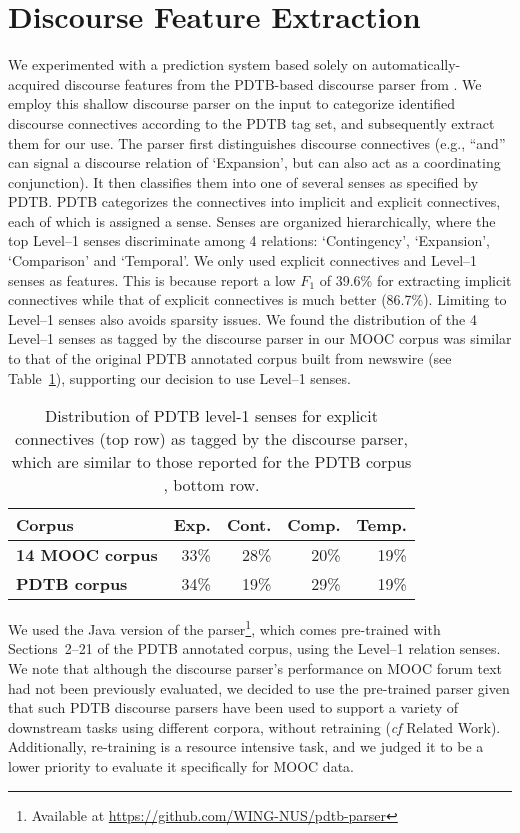 \documentclass[letterpaper]{article}
\begin{document}
\section{Discourse Feature Extraction}
\label{sect:feature}
We experimented with a prediction system based solely on
automatically-acquired discourse features from the PDTB-based discourse
parser from \cite{Lin2014}.
We employ this shallow discourse parser on the input to categorize identified discourse connectives
according to the PDTB tag set, and subsequently extract them for our use.
The parser first distinguishes discourse connectives (e.g., ``and'' can signal 
a discourse relation of `Expansion', but can also act as a coordinating conjunction). It then 
classifies them into one of several senses as specified by PDTB. PDTB 
categorizes the connectives into implicit and explicit connectives, each of 
which is assigned a sense. Senses are organized hierarchically, where the top 
Level--1 senses discriminate among 4 relations: 
`Contingency', `Expansion', `Comparison' and `Temporal'. 
We only used explicit connectives and Level--1 
senses as features. This is because \cite{Lin2014} report a low $F_1$ of 
39.6\% for extracting implicit connectives while that of explicit 
connectives is much better (86.7\%). Limiting to Level--1 senses also 
avoids sparsity issues. We found the distribution of the 4 Level--1 senses
as tagged by the discourse parser 
in our MOOC corpus was similar to that of the original PDTB annotated 
corpus built from 
newswire (see Table~\ref{tab:corpCompare}), supporting our decision to
use Level--1 senses. 

\begin{table}
\centering
\def\arraystretch{1.2}%
\begin{tabular}{|l|r|r|r|r|}
\hline
\bf Corpus&  Exp.& Cont.& Comp. & Temp.\\
\hline
\small
\bf 14 MOOC corpus& 33\%&  28\%& 20\%& 19\%\\
\bf PDTB corpus&  34\%&  19\%& 29\%& 19\%\\
\hline
\end{tabular}
\caption{Distribution of PDTB level-1 senses for explicit connectives 
(top row) as tagged by the discourse parser, which are similar 
to those reported for the PDTB corpus \cite{Prasad2008}, bottom row.}
\label{tab:corpCompare}
\end{table}

We used  the Java version of the parser\footnote{Available at 
\url{https://github.com/WING-NUS/pdtb-parser}}, which comes pre-trained
with Sections~2--21 of the PDTB annotated corpus, using 
the {Level--1} relation senses. 
We note that although the discourse parser's performance on MOOC forum
text had not been previously evaluated, we decided to use the
pre-trained parser given that such PDTB discourse parsers have been
used to support a variety of downstream tasks using different corpora,
without retraining ({\it cf} Related Work). Additionally, re-training
is a resource intensive task, and we judged it to be a lower priority
to evaluate it specifically for MOOC data.
\end{document}
